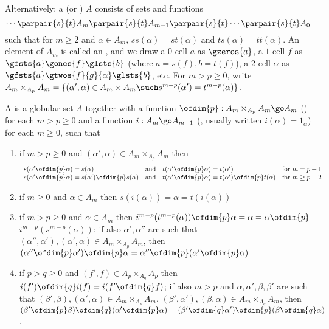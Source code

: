 Alternatively: a  (or ) $A$
consists of sets and functions
\[
\cdots 
\parpair{s}{t} A_m  \parpair{s}{t} A_{m-1} \parpair{s}{t} 
\cdots 
\parpair{s}{t} A_0
\]
such that for $m\geq 2$ and $\alpha\in A_m$, $ss(\alpha) = st(\alpha)$ and
$ts(\alpha) = tt(\alpha)$.  An element of $A_m$ is called an
, and we draw a $0$-cell $a$ as $\gzeros{a}$, a $1$-cell $f$
as $\gfsts{a}\gones{f}\glsts{b}$ (where $a=s(f), b=t(f)$), a 2-cell $\alpha$
as $\gfsts{a}\gtwos{f}{g}{\alpha}\glsts{b}$, etc.  For $m > p \geq 0$, write
$ A_m \times_{A_p} A_m = \{ (\alpha',\alpha) \in A_m \times A_m \such
s^{m-p}(\alpha') = t^{m-p}(\alpha) \}$.

A  is a globular set $A$ together with a
function $\ofdim{p}: A_m \times_{A_p} A_m \go A_m$ () for
each $m > p \geq 0$ and a function $i: A_m \go A_{m+1}$ (,
usually written $i(\alpha) = 1_\alpha$) for each $m\geq 0$, such that
%
\begin{enumerate}
\item 	\label{part:strict-n:source-comp}
if $m > p \geq 0$ and
$(\alpha',\alpha) \in A_m \times_{A_p} A_m$ then
\[
\begin{array}{llll}
s(\alpha' \ofdim{p} \alpha) = 
s(\alpha) 			&	
\textrm{and}			&
t(\alpha' \ofdim{p} \alpha) = 
t(\alpha') 			&
\textrm{for }
m=p+1	\\
s(\alpha' \ofdim{p} \alpha) = 
s(\alpha') \ofdim{p} s(\alpha)	&
\textrm{and}			&
t(\alpha' \ofdim{p} \alpha) = 
t(\alpha') \ofdim{p} t(\alpha)	&
\textrm{for }
m\geq p+2	
\end{array}
\]
\item  	\label{part:strict-n:source-id}
if $m\geq 0$ and $\alpha\in A_m$ then $s(i(\alpha)) = \alpha =
t(i(\alpha))$ 
\item \label{part:strict-n:ass-and-id} 
if $m > p \geq 0$ and $\alpha \in A_m$ then $i^{m-p}(t^{m-p}(\alpha))
\ofdim{p} \alpha = \alpha = \alpha \ofdim{p}$\linebreak
$i^{m-p}(s^{m-p}(\alpha))$; if also $\alpha', \alpha''$ are such that
$(\alpha'', \alpha'), (\alpha', \alpha) \in A_m \times_{A_p} A_m$, then
$(\alpha'' \ofdim{p} \alpha') \ofdim{p} \alpha = \alpha'' \ofdim{p} (\alpha'
\ofdim{p} \alpha)$
\item  	\label{part:strict-n:int}
if $p>q\geq 0$ and $(f',f) \in A_p \times_{A_q} A_p$ then
$i(f') \ofdim{q} i(f) = i(f' \ofdim{q} f)$; 
if also $m>p$ and $\alpha,\alpha',\beta,\beta'$ are such that
$(\beta',\beta), (\alpha', \alpha) \in A_m \times_{A_p} A_m$, 
$(\beta',\alpha'), (\beta, \alpha) \in A_m \times_{A_q} A_m$,
then 
$(\beta' \ofdim{p} \beta) \ofdim{q} (\alpha' \ofdim{p} \alpha) 
= 
(\beta' \ofdim{q} \alpha') \ofdim{p} (\beta \ofdim{q} \alpha)$.
\end{enumerate}

